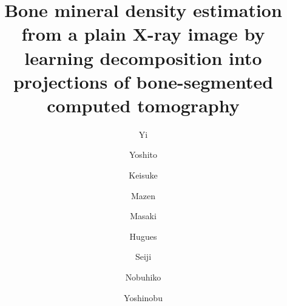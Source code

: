 \documentclass[times,twocolumn,final]{elsarticle}
\begin{document}

\begin{frontmatter}

\title{Bone mineral density estimation from a plain X-ray image by learning decomposition into projections of bone-segmented computed tomography}

\author[1,4]{Yi }
\author[1]{Yoshito }

\author[2]{Keisuke }

\author[1]{Mazen }

\author[3]{Masaki }

\author[4]{Hugues }

\author[2]{Seiji }

\author[5]{Nobuhiko }

\author[1]{Yoshinobu }

\address[1]{Graduate School of Science and Technology, Nara Institute of Science and Technology, Ikoma, Nara 630-0192, Japan}
\address[2]{Department of Orthopaedic Surgery, Osaka University Graduate School of Medicine, Suita, Osaka 565-0871, Japan}
\address[3]{Department of Bone and Joint Surgery, Ehime University Graduate School of Medicine, Toon, Ehime 791-0295, Japan}
\address[4]{CentraleSupélec, Université Paris-Saclay, Inria, Gif-sur-Yvette 91190, France}
\address[5]{Department of Orthopedic Medical Engineering, Osaka University Graduate School of Medicine, Suita, Osaka 565-0871, Japan}



\end{frontmatter}
\end{document}
